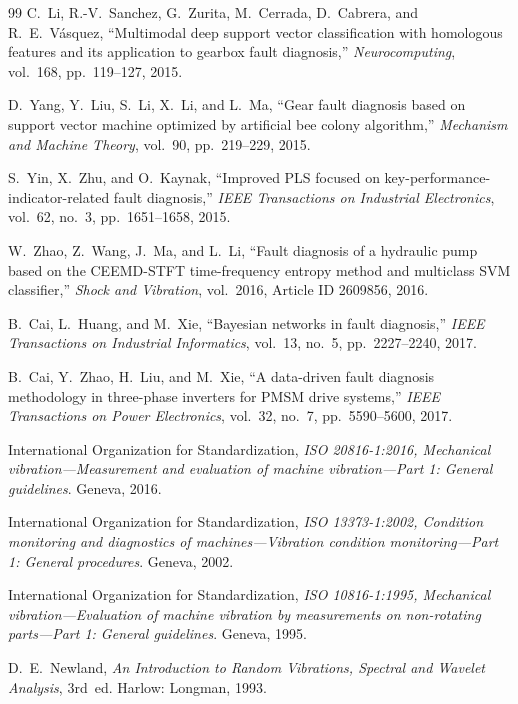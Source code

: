 \begin{thebibliography}{99}
C.~Li, R.-V.~Sanchez, G.~Zurita, M.~Cerrada, D.~Cabrera, and R.~E.~V\'asquez,
``Multimodal deep support vector classification with homologous features and its application to gearbox fault diagnosis,''
\textit{Neurocomputing}, vol.~168, pp.~119--127, 2015.

D.~Yang, Y.~Liu, S.~Li, X.~Li, and L.~Ma,
``Gear fault diagnosis based on support vector machine optimized by artificial bee colony algorithm,''
\textit{Mechanism and Machine Theory}, vol.~90, pp.~219--229, 2015.

S.~Yin, X.~Zhu, and O.~Kaynak,
``Improved PLS focused on key-performance-indicator-related fault diagnosis,''
\textit{IEEE Transactions on Industrial Electronics}, vol.~62, no.~3, pp.~1651--1658, 2015.

W.~Zhao, Z.~Wang, J.~Ma, and L.~Li,
``Fault diagnosis of a hydraulic pump based on the CEEMD-STFT time-frequency entropy method and multiclass SVM classifier,''
\textit{Shock and Vibration}, vol.~2016, Article ID 2609856, 2016.

B.~Cai, L.~Huang, and M.~Xie,
``Bayesian networks in fault diagnosis,''
\textit{IEEE Transactions on Industrial Informatics}, vol.~13, no.~5, pp.~2227--2240, 2017.

B.~Cai, Y.~Zhao, H.~Liu, and M.~Xie,
``A data-driven fault diagnosis methodology in three-phase inverters for PMSM drive systems,''
\textit{IEEE Transactions on Power Electronics}, vol.~32, no.~7, pp.~5590--5600, 2017.

International Organization for Standardization,
\textit{ISO 20816-1:2016, Mechanical vibration---Measurement and evaluation of machine vibration---Part 1: General guidelines}.
Geneva, 2016.

International Organization for Standardization,
\textit{ISO 13373-1:2002, Condition monitoring and diagnostics of machines---Vibration condition monitoring---Part 1: General procedures}.
Geneva, 2002.

International Organization for Standardization,
\textit{ISO 10816-1:1995, Mechanical vibration---Evaluation of machine vibration by measurements on non-rotating parts---Part 1: General guidelines}.
Geneva, 1995.

D.~E.~Newland,
\textit{An Introduction to Random Vibrations, Spectral and Wavelet Analysis}, 3rd~ed.
Harlow: Longman, 1993.


\end{thebibliography}
